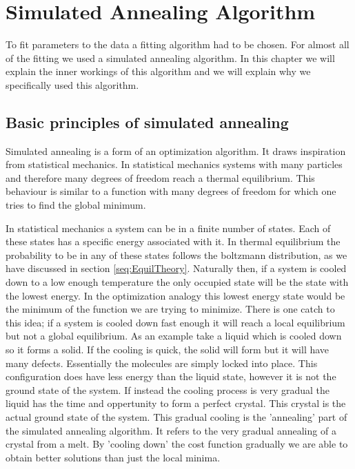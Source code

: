 
\chapter{Simulated Annealing Algorithm}

To fit parameters to the data a fitting algorithm had to be chosen. For almost all of the fitting we used a simulated annealing algorithm. In this chapter we will explain the inner workings of this algorithm and we will explain why we specifically used this algorithm.



\section{Basic principles of simulated annealing}

\cite{SA} %

Simulated annealing is a form of an optimization algorithm. It draws inspiration from statistical mechanics. In statistical mechanics systems with many particles and therefore many degrees of freedom reach a thermal equilibrium. This behaviour is similar to a function with many degrees of freedom for which one tries to find the global minimum.

In statistical mechanics a system can be in a finite number of states. Each of these states has a specific energy associated with it. In thermal equilibrium the probability to be in any of these states follows the boltzmann distribution, as we have discussed in section \ref{seq:EquilTheory}. Naturally then, if a system is cooled down to a low enough temperature the only occupied state will be the state with the lowest energy. In the optimization analogy this lowest energy state would be the minimum of the function we are trying to minimize. There is one catch to this idea; if a system is cooled down fast enough it will reach a local equilibrium but not a global equilibrium. As an example take a liquid which is cooled down so it forms a solid. If the cooling is quick, the solid will form but it will have many defects. Essentially the molecules are simply locked into place. This configuration does have less energy than the liquid state, however it is not the ground state of the system. If instead the cooling process is very gradual the liquid has the time and oppertunity to form a perfect crystal. This crystal is the actual ground state of the system. This gradual cooling is the 'annealing' part of the simulated annealing algorithm. It refers to the very gradual annealing of a crystal from a melt. By 'cooling down' the cost function gradually we are able to obtain better solutions than just the local minima.

